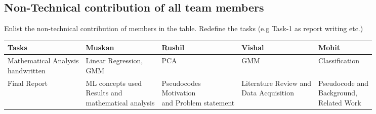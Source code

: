 \documentclass{article}
\begin{document}
\subsection{Non-Technical contribution of all team members }
Enlist the non-technical contribution of members in the table. Redefine the tasks (e.g Task-1 as report writing etc.)
\begin{table}[h]
\centering
\begin{tabular}{|l|l|l|l|l|}
\hline
Tasks  & Muskan & Rushil & Vishal & Mohit \\ \hline
\makecell{Mathematical Analysis \\ handwritten} &   \makecell{ Linear Regression, \\ GMM}            &         PCA       &     GMM        &      Classification        \\ \hline
Final Report &  \makecell{ML concepts used \\ Results and \\ mathematical analysis} &   \makecell{Pseudocodes \\ Motivation \\ and Problem statement}   &    \makecell{Literature Review and \\ Data Acquisition}   & \makecell{Pseudocode and \\ Background, \\ Related Work}           \\ \hline

\end{tabular}
\end{table}
\end{document}
